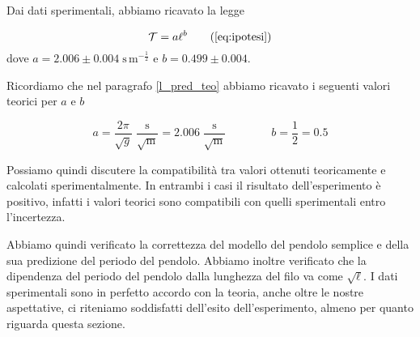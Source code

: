 Dai dati sperimentali, abbiamo ricavato la legge

\begin{equation}
    \mathcal{T} = a\ell^b
    \tag{\ref{eq:ipotesi}}
\end{equation}
%
dove $a = 2.006 \pm 0.004 \; \text{s}\,\text{m}^{-\frac{1}{2}}$ e $b = 0.499 \pm 0.004$.

Ricordiamo che nel paragrafo \ref{l_pred_teo} abbiamo ricavato i seguenti valori teorici per $a$ e $b$

\begin{equation}
    a = \frac{2\pi}{\sqrt{g}} \; \frac{\text{s}}{\sqrt{\text{m}}} = 2.006 \; \frac{\text{s}}{\sqrt{\text{m}}} \qquad \qquad b = \frac{1}{2} = 0.5
\end{equation}

Possiamo quindi discutere la compatibilità tra valori ottenuti teoricamente e calcolati sperimentalmente.
In entrambi i casi il risultato dell'esperimento è positivo, infatti i valori teorici sono compatibili
con quelli sperimentali entro l'incertezza.

Abbiamo quindi verificato la correttezza del modello del pendolo semplice e della sua predizione del periodo
del pendolo. Abbiamo inoltre verificato che la dipendenza del periodo del pendolo dalla lunghezza del filo
va come $\sqrt{\ell}$. I dati sperimentali sono in perfetto accordo con la teoria, anche oltre le nostre aspettative,
ci riteniamo soddisfatti dell'esito dell'esperimento, almeno per quanto riguarda questa sezione.